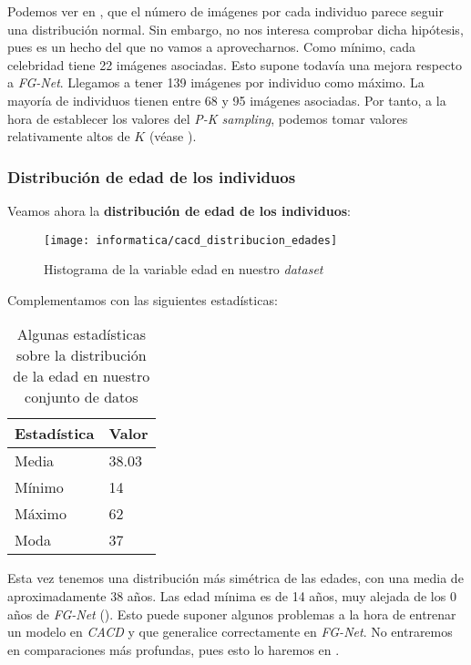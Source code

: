 Podemos ver en , que el número de imágenes por cada individuo parece seguir una distribución normal. Sin embargo, no nos interesa comprobar dicha hipótesis, pues es un hecho del que no vamos a aprovecharnos. Como mínimo, cada celebridad tiene 22 imágenes asociadas. Esto supone todavía una mejora respecto a \textit{FG-Net}. Llegamos a tener 139 imágenes por individuo como máximo. La mayoría de individuos tienen entre 68 y 95 imágenes asociadas. Por tanto, a la hora de establecer los valores del \textit{P-K sampling}, podemos tomar valores relativamente altos de $K$ (véase ).

\subsubsection{Distribución de edad de los individuos}

Veamos ahora la \textbf{distribución de edad de los individuos}:

\begin{figure}[H]
    \centering
    \texttt{[image: informatica/cacd\_distribucion\_edades]}
    \caption{Histograma de la variable edad en nuestro \textit{dataset}}
\end{figure}

Complementamos con las siguientes estadísticas:

\begin{table}[H]
\centering
\begin{tabular}{|l|l|}
    \hline
    \textbf{Estadística} & \textbf{Valor} \\
    \hline

    Media  & 38.03 \\
    Mínimo & 14    \\
    Máximo & 62    \\
    Moda   & 37    \\

    \hline

\end{tabular}
\caption{Algunas estadísticas sobre la distribución de la edad en nuestro conjunto de datos}
\end{table}

Esta vez tenemos una distribución más simétrica de las edades, con una media de aproximadamente 38 años. Las edad mínima es de 14 años, muy alejada de los 0 años de \textit{FG-Net} (). Esto puede suponer algunos problemas a la hora de entrenar un modelo en \textit{CACD} y que generalice correctamente en \textit{FG-Net}. No entraremos en comparaciones más profundas, pues esto lo haremos en .

